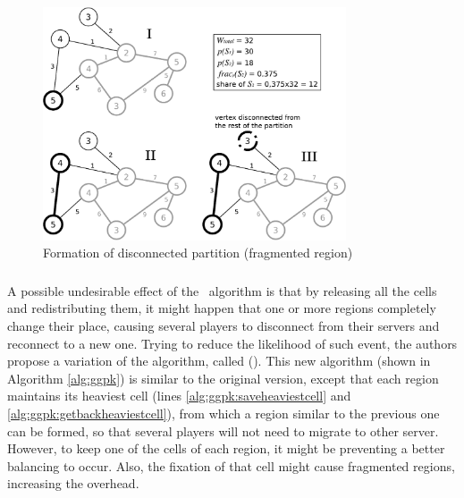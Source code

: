 \begin{figure}
\centering
\includegraphics[width=0.8\textwidth]{images/compressed}
\caption{Formation of disconnected partition (fragmented region)}
\label{fig:compressed}
\end{figure}

\subsubsection{\ggpk} %

A possible undesirable effect of the \ggp\ algorithm is that by releasing all the cells and redistributing them, it might happen that one or more regions completely change their place, causing several players to disconnect from their servers and reconnect to a new one. Trying to reduce the likelihood of such event, the authors propose a variation of the algorithm, called \textbf{\ggpk} (\ggpkmeaning). This new algorithm (shown in Algorithm \ref{alg:ggpk}) is similar to the original version, except that each region maintains its heaviest cell (lines \ref{alg:ggpk:saveheaviestcell} and \ref{alg:ggpk:getbackheaviestcell}), from which a region similar to the previous one can be formed, so that several players will not need to migrate to other server. However, to keep one of the cells of each region, it might be preventing a better balancing to occur. Also, the fixation of that cell might cause fragmented regions, increasing the overhead.


